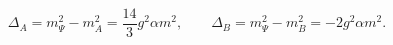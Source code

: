 \begin{equation}
\label{eq:def_delta}
  \Delta_A=m_\Psi^2-m_A^2=\frac{14}{3}g^2\alpha m^2,\qquad
  \Delta_B=m_\Psi^2-m_B^2=-2g^2\alpha m^2.
\end{equation}

